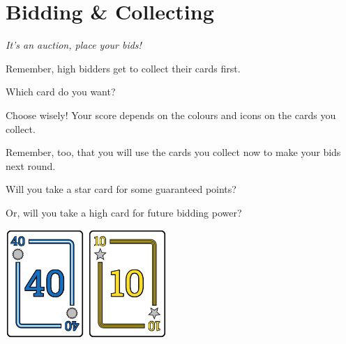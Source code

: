 \documentclass[a5paper, DIV=18, 12pt]{scrartcl}
\begin{document}
\section*{\phantom{a}\hfill Bidding \& Collecting \hfill \phantom{a}}
\begin{multicols}{2}\itshape
It's an auction, place your bids!

\vspace{1ex}

Remember, high bidders get to collect their cards first.

\vspace{1ex}

Which card do you want? 

\vspace{0.9ex}

Choose wisely! Your score depends on the colours and icons on the cards you collect.

\vspace{0.9ex}

Remember, too, that you will use the cards you collect now to make your bids next round.

\vspace{0.9ex}

Will you take a star card for some guaranteed points? 

\vspace{0.9ex}

Or, will you take a high card for future bidding power?
\normalshape
\vfill\null

\vfill

\begin{center}
%

\includegraphics[width=0.225\textwidth]{Images/single_display_card_40.pdf} \hfill \includegraphics[width=0.225\textwidth]{Images/single_display_card_10.pdf} 


\end{center}
\end{multicols}
\end{document}
